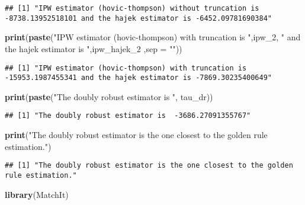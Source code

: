 \documentclass[]{article}
\newenvironment{Shaded}{\begin{snugshade}}{\end{snugshade}}
\newcommand{\KeywordTok}[1]{\textcolor[rgb]{0.13,0.29,0.53}{\textbf{#1}}}
\newcommand{\DataTypeTok}[1]{\textcolor[rgb]{0.13,0.29,0.53}{#1}}
\newcommand{\DecValTok}[1]{\textcolor[rgb]{0.00,0.00,0.81}{#1}}
\newcommand{\StringTok}[1]{\textcolor[rgb]{0.31,0.60,0.02}{#1}}
\newcommand{\NormalTok}[1]{#1}
\begin{document}
\begin{verbatim}
## [1] "IPW estimator (hovic-thompson) without truncation is -8738.13952518101 and the hajek estimator is -6452.09781690384"
\end{verbatim}

\begin{Shaded}
\begin{Highlighting}[]
\KeywordTok{print}\NormalTok{(}\KeywordTok{paste}\NormalTok{(}\StringTok{"IPW estimator (hovic-thompson) with truncation is "}\NormalTok{,ipw_}\DecValTok{2}\NormalTok{, }\StringTok{" and the hajek estimator is "}\NormalTok{,ipw_hajek_}\DecValTok{2}\NormalTok{ ,}\DataTypeTok{sep =} \StringTok{""}\NormalTok{))}
\end{Highlighting}
\end{Shaded}

\begin{verbatim}
## [1] "IPW estimator (hovic-thompson) with truncation is -15953.1987455341 and the hajek estimator is -7869.30235400649"
\end{verbatim}

\begin{Shaded}
\begin{Highlighting}[]
\KeywordTok{print}\NormalTok{(}\KeywordTok{paste}\NormalTok{(}\StringTok{"The doubly robust estimator is "}\NormalTok{, tau_dr))}
\end{Highlighting}
\end{Shaded}

\begin{verbatim}
## [1] "The doubly robust estimator is  -3686.27091355767"
\end{verbatim}

\begin{Shaded}
\begin{Highlighting}[]
\KeywordTok{print}\NormalTok{(}\StringTok{"The doubly robust estimator is the one closest to the golden rule estimation."}\NormalTok{)}
\end{Highlighting}
\end{Shaded}

\begin{verbatim}
## [1] "The doubly robust estimator is the one closest to the golden rule estimation."
\end{verbatim}

\begin{Shaded}
\begin{Highlighting}[]
\KeywordTok{library}\NormalTok{(MatchIt)}
\end{Highlighting}
\end{Shaded}
\end{document}
